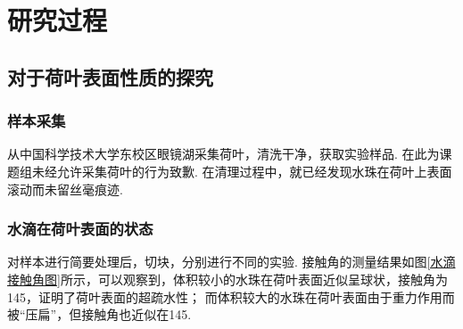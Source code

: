 \documentclass[a4paper,12pt]{article}%
\begin{document}
\section{研究过程}
\subsection{对于荷叶表面性质的探究}
\subsubsection{样本采集}
\begin{spacing}{1.528}%
从中国科学技术大学东校区眼镜湖采集荷叶，清洗干净，获取实验样品. 
在此为课题组未经允许采集荷叶的行为致歉. 
在清理过程中，就已经发现水珠在荷叶上表面滚动而未留丝毫痕迹. 
\end{spacing}

\subsubsection{水滴在荷叶表面的状态}
\begin{spacing}{1.528}%
对样本进行简要处理后，切块，分别进行不同的实验. 
接触角的测量结果如图\ref{水滴接触角图}所示，可以观察到，体积较小的水珠在荷叶表面近似呈球状，接触角为145\degree，证明了荷叶表面的超疏水性；
而体积较大的水珠在荷叶表面由于重力作用而被“压扁”，但接触角也近似在145\degree. 
\end{spacing}
\end{document}
